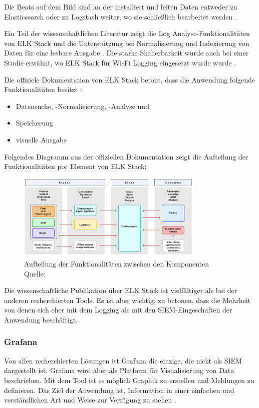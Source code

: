 Die Beats auf dem Bild sind an der  installiert und leiten Daten entweder zu Elasticsearch oder zu Logstash weiter, wo sie schließlich bearbeitet werden \citep{Jain_LMELK}. 

Ein Teil der wissenschaftlichen Literatur zeigt die Log Analyse-Funktionalitäten von ELK Stack und die Unterstützung bei Normalisierung und Indexierung von Daten für eine lesbare Ausgabe \citep{Advani_elkstakc}. Die starke Skalierbarkeit wurde auch bei einer Studie erwähnt, wo ELK Stack für Wi-Fi Logging eingesetzt wurde wurde \citep{Wang_elkwifi}.

Die offiziele Dokumentation von ELK Stack betont, dass die Anwendung folgende Funktionalitäten besitzt \citep{elastic_docs}:

\begin{itemize}[noitemsep]
   \item Datensuche, -Normalisierung, -Analyse und 
   \item Speicherung
   \item visuelle Ausgabe
\end{itemize}

Folgendes Diagramm aus der offiziellen Dokumentation zeigt die Aufteilung der Funktionalitäten por Element von ELK Stack:

\begin{figure}[H]
   \centering
   \includegraphics[width=0.8\textwidth]{assets/2_p9.png}
   \caption{Aufteilung der Funktionalitäten zwischen den Komponenten\\Quelle: \citep{elastic_docs}}
   \centering
\end{figure}

Die wissenschaftliche Publikation über ELK Stack ist vielfältiger als bei der anderen recherchierten Tools. Es ist aber wichtig, zu betonen, dass die Mehrheit von denen sich eher mit dem Logging als mit den \gls{SIEM}-Eingeschaften der Anwendung beschäftigt.

\subsubsection{Grafana}
Von allen recherchierten Lösungen ist Grafana die einzige, die nicht als \gls{SIEM} dargestellt ist. Grafana wird aber als Platform für Visualisierung von Data beschrieben. Mit dem Tool ist es möglich Graphik zu erstellen und Meldungen zu definieren. Das Ziel der Anwendung ist, Information in einer einfachen und verständlichen Art und Weise zur Verfügung zu stehen \citep{redhat_grafana}.     

